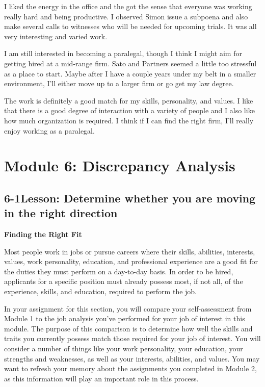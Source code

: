 I liked the energy in the office and the got the sense that everyone was working really hard and being productive. I observed Simon issue a subpoena and also make several calls to witnesses who will be needed for upcoming trials. It was all very interesting and varied work.

I am still interested in becoming a paralegal, though I think I might aim for getting hired at a mid-range firm. Sato and Partners seemed a little too stressful as a place to start. Maybe after I have a couple years under my belt in a smaller environment, I'll either move up to a larger firm or go get my law degree.

The work is definitely a good match for my skills, personality, and values. I like that there is a good degree of interaction with a variety of people and I also like how much organization is required. I think if I can find the right firm, I'll really enjoy working as a paralegal.
 
 
\pagebreak \section*{Module 6:	Discrepancy  Analysis}
\noindent\makebox[\textwidth]{\rule{\linewidth}{0.4pt}}  \localtableofcontents 
\noindent\makebox[\textwidth]{\rule{\linewidth}{0.4pt}} 


\pagebreak \subsection*{6-1\quad Lesson: Determine whether you are moving in the right direction}

\textbf{Finding the Right Fit}

Most people work in jobs or pursue careers where their skills, abilities, interests, values, work personality, education, and professional experience are a good fit for the duties they must perform on a day-to-day basis. In order to be hired, applicants for a specific position must already possess most, if not all, of the experience, skills, and education, required to perform the job.

In your assignment for this section, you will compare your self-assessment from Module 1 to the job analysis you've performed for your job of interest in this module. The purpose of this comparison is to determine how well the skills and traits you currently possess match those required for your job of interest. You will consider a number of things like your work personality, your education, your strengths and weaknesses, as well as your interests, abilities, and values. You may want to refresh your memory about the assignments you completed in Module 2, as this information will play an important role in this process.

